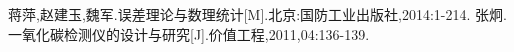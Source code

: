 \begin{thebibliography}{0}
	 蒋萍,赵建玉,魏军.误差理论与数理统计[M].北京:国防工业出版社,2014:1-214.
	 张炯.一氧化碳检测仪的设计与研究[J].价值工程,2011,04:136-139.
\end{thebibliography}